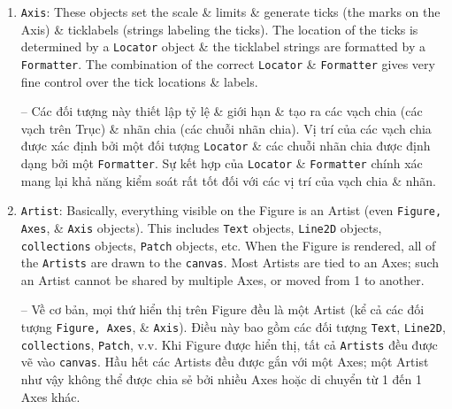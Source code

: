 \documentclass{article}
\begin{document}
\begin{enumerate}
    -- Axes là 1 Artist gắn liền với một Figure chứa một vùng để vẽ dữ liệu, \& thường bao gồm 2 (hoặc 3 trong trường hợp 3D) {\tt Axis} đối tượng (lưu ý sự khác biệt giữa {\tt Axes, Axis}) cung cấp các dấu \& nhãn dấu để cung cấp thang đo cho dữ liệu trong Axes. Mỗi {\tt Axes} cũng có một tiêu đề (được thiết lập thông qua \verb|set_title()|), một nhãn $x$ (được thiết lập thông qua \verb|set_xlabel()|), \& một nhãn $y$ (được thiết lập thông qua \verb|set_ylabel()|).
    
    The {\tt Axes} methods are the primary interface or configuring most parts of your plot (adding data, controlling axis scales \& limits, adding labels, etc.).
    
    -- Các phương thức {\tt Axes} là giao diện chính hoặc cấu hình hầu hết các phần của biểu đồ (thêm dữ liệu, kiểm soát tỷ lệ trục \& giới hạn, thêm nhãn, v.v.).
    \item {\tt Axis}: These objects set the scale \& limits \& generate ticks (the marks on the Axis) \& ticklabels (strings labeling the ticks). The location of the ticks is determined by a {\tt Locator} object \& the ticklabel strings are formatted by a {\tt Formatter}. The combination of the correct {\tt Locator} \& {\tt Formatter} gives very fine control over the tick locations \& labels.
    
    -- Các đối tượng này thiết lập tỷ lệ \& giới hạn \& tạo ra các vạch chia (các vạch trên Trục) \& nhãn chia (các chuỗi nhãn chia). Vị trí của các vạch chia được xác định bởi một đối tượng {\tt Locator} \& các chuỗi nhãn chia được định dạng bởi một {\tt Formatter}. Sự kết hợp của {\tt Locator} \& {\tt Formatter} chính xác mang lại khả năng kiểm soát rất tốt đối với các vị trí của vạch chia \& nhãn.
    \item {\tt Artist}: Basically, everything visible on the Figure is an Artist (even {\tt Figure, Axes}, \& {\tt Axis} objects). This includes {\tt Text} objects, {\tt Line2D} objects, {\tt collections} objects, {\tt Patch} objects, etc. When the Figure is rendered, all of the {\tt Artists} are drawn to the {\tt canvas}. Most Artists are tied to an Axes; such an Artist cannot be shared by multiple Axes, or moved from 1 to another.
    
    -- Về cơ bản, mọi thứ hiển thị trên Figure đều là một Artist (kể cả các đối tượng {\tt Figure, Axes}, \& {\tt Axis}). Điều này bao gồm các đối tượng {\tt Text}, {\tt Line2D}, {\tt collections}, {\tt Patch}, v.v. Khi Figure được hiển thị, tất cả {\tt Artists} đều được vẽ vào {\tt canvas}. Hầu hết các Artists đều được gắn với một Axes; một Artist như vậy không thể được chia sẻ bởi nhiều Axes hoặc di chuyển từ 1 đến 1 Axes khác.
\end{enumerate}
\end{document}
